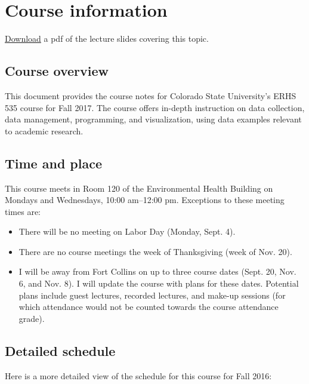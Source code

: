\documentclass[]{book}
\providecommand{\tightlist}{%
  \setlength{\itemsep}{0pt}\setlength{\parskip}{0pt}}
\theoremstyle{definition}
\theoremstyle{definition}
\theoremstyle{definition}
\theoremstyle{remark}
\begin{document}
\mainmatter

\chapter*{Course information}\label{course-information}

\href{https://github.com/geanders/RProgrammingForResearch/raw/master/slides/CourseOverview.pdf}{Download}
a pdf of the lecture slides covering this topic.

\section{Course overview}\label{course-overview}

This document provides the course notes for Colorado State University's
ERHS 535 course for Fall 2017. The course offers in-depth instruction on
data collection, data management, programming, and visualization, using
data examples relevant to academic research.

\section{Time and place}\label{time-and-place}

This course meets in Room 120 of the Environmental Health Building on
Mondays and Wednesdays, 10:00 am--12:00 pm. Exceptions to these meeting
times are:

\begin{itemize}
\tightlist
\item
  There will be no meeting on Labor Day (Monday, Sept. 4).
\item
  There are no course meetings the week of Thanksgiving (week of Nov.
  20).
\item
  I will be away from Fort Collins on up to three course dates (Sept.
  20, Nov. 6, and Nov. 8). I will update the course with plans for these
  dates. Potential plans include guest lectures, recorded lectures, and
  make-up sessions (for which attendance would not be counted towards
  the course attendance grade). 
\end{itemize}

\section{Detailed schedule}\label{detailed-schedule}

Here is a more detailed view of the schedule for this course for Fall
2016:
\end{document}

